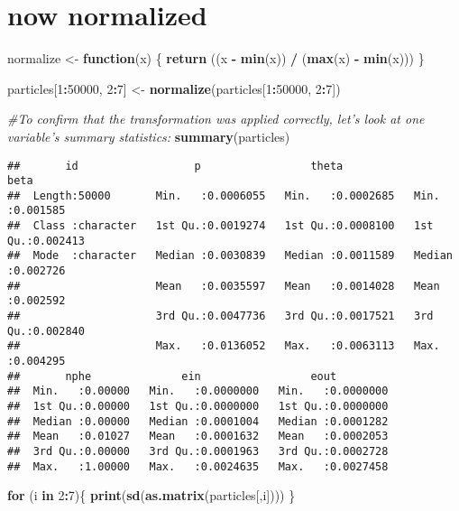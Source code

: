 \documentclass[
]{article}
\newenvironment{Shaded}{\begin{snugshade}}{\end{snugshade}}
\newcommand{\CommentTok}[1]{\textcolor[rgb]{0.56,0.35,0.01}{\textit{#1}}}
\newcommand{\ControlFlowTok}[1]{\textcolor[rgb]{0.13,0.29,0.53}{\textbf{#1}}}
\newcommand{\DecValTok}[1]{\textcolor[rgb]{0.00,0.00,0.81}{#1}}
\newcommand{\KeywordTok}[1]{\textcolor[rgb]{0.13,0.29,0.53}{\textbf{#1}}}
\newcommand{\NormalTok}[1]{#1}
\newcommand{\OperatorTok}[1]{\textcolor[rgb]{0.81,0.36,0.00}{\textbf{#1}}}
\newcommand{\StringTok}[1]{\textcolor[rgb]{0.31,0.60,0.02}{#1}}
\begin{document}
\hypertarget{now-normalized}{%
\section{now normalized}\label{now-normalized}}

\begin{Shaded}
\begin{Highlighting}[]
\NormalTok{normalize <-}\StringTok{ }\ControlFlowTok{function}\NormalTok{(x) \{}
\KeywordTok{return}\NormalTok{ ((x }\OperatorTok{-}\StringTok{ }\KeywordTok{min}\NormalTok{(x)) }\OperatorTok{/}\StringTok{ }\NormalTok{(}\KeywordTok{max}\NormalTok{(x) }\OperatorTok{-}\StringTok{ }\KeywordTok{min}\NormalTok{(x)))}
\NormalTok{\}}

\NormalTok{particles[}\DecValTok{1}\OperatorTok{:}\DecValTok{50000}\NormalTok{, }\DecValTok{2}\OperatorTok{:}\DecValTok{7}\NormalTok{] <-}\StringTok{ }\KeywordTok{normalize}\NormalTok{(particles[}\DecValTok{1}\OperatorTok{:}\DecValTok{50000}\NormalTok{, }\DecValTok{2}\OperatorTok{:}\DecValTok{7}\NormalTok{])}


\CommentTok{#To confirm that the transformation was applied correctly, let's look at one variable's summary statistics:}
\KeywordTok{summary}\NormalTok{(particles)}
\end{Highlighting}
\end{Shaded}

\begin{verbatim}
##       id                  p                 theta                beta         
##  Length:50000       Min.   :0.0006055   Min.   :0.0002685   Min.   :0.001585  
##  Class :character   1st Qu.:0.0019274   1st Qu.:0.0008100   1st Qu.:0.002413  
##  Mode  :character   Median :0.0030839   Median :0.0011589   Median :0.002726  
##                     Mean   :0.0035597   Mean   :0.0014028   Mean   :0.002592  
##                     3rd Qu.:0.0047736   3rd Qu.:0.0017521   3rd Qu.:0.002840  
##                     Max.   :0.0136052   Max.   :0.0063113   Max.   :0.004295  
##       nphe              ein                 eout          
##  Min.   :0.00000   Min.   :0.0000000   Min.   :0.0000000  
##  1st Qu.:0.00000   1st Qu.:0.0000000   1st Qu.:0.0000000  
##  Median :0.00000   Median :0.0001004   Median :0.0001282  
##  Mean   :0.01027   Mean   :0.0001632   Mean   :0.0002053  
##  3rd Qu.:0.00000   3rd Qu.:0.0001963   3rd Qu.:0.0002728  
##  Max.   :1.00000   Max.   :0.0024635   Max.   :0.0027458
\end{verbatim}

\begin{Shaded}
\begin{Highlighting}[]
\ControlFlowTok{for}\NormalTok{ (i }\ControlFlowTok{in} \DecValTok{2}\OperatorTok{:}\DecValTok{7}\NormalTok{)\{}
  \KeywordTok{print}\NormalTok{(}\KeywordTok{sd}\NormalTok{(}\KeywordTok{as.matrix}\NormalTok{(particles[,i])))}
\NormalTok{\}}
\end{Highlighting}
\end{Shaded}
\end{document}
